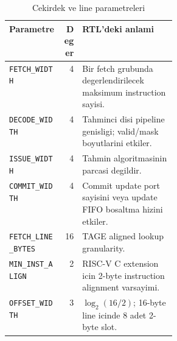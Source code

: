 \documentclass[11pt,a4paper]{article}
\newcommand{\param}[1]{\texttt{#1}}
\begin{document}
\begin{table}[!htbp]
\centering
\caption{Cekirdek ve line parametreleri}
\label{tab:core-params}
\small
\begin{tabularx}{\linewidth}{@{}>{\raggedright\arraybackslash}p{0.32\linewidth}rY@{}}
\toprule
Parametre & Deger & RTL'deki anlami \\
\midrule
\param{FETCH\_WIDTH} & 4 & Bir fetch grubunda degerlendirilecek maksimum instruction sayisi. \\
\param{DECODE\_WIDTH} & 4 & Tahminci disi pipeline genisligi; valid/mask boyutlarini etkiler. \\
\param{ISSUE\_WIDTH} & 4 & Tahmin algoritmasinin parcasi degildir. \\
\param{COMMIT\_WIDTH} & 4 & Commit update port sayisini veya update FIFO bosaltma hizini etkiler. \\
\param{FETCH\_LINE\_BYTES} & 16 & TAGE aligned lookup granularity. \\
\param{MIN\_INST\_ALIGN} & 2 & RISC-V C extension icin 2-byte instruction alignment varsayimi. \\
\param{OFFSET\_WIDTH} & 3 & $\log_2(16/2)$; 16-byte line icinde 8 adet 2-byte slot. \\
\bottomrule
\end{tabularx}
\end{table}
\end{document}
